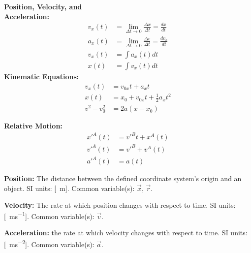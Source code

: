 \begin{importantEquations}
\begin{multicols}{2}
\begin{center}
\textbf{Position, Velocity, and\\ Acceleration:}
\begin{align*}
v_x(t)&=\lim_{\Delta t\to 0}\frac{\Delta x}{\Delta t}=\frac{dx}{dt}\\
a_x(t)&=\lim_{\Delta t\to 0}\frac{\Delta v}{\Delta t}=\frac{dv_x}{dt}\\
v_x(t)&=\int a_x(t)dt\\
x(t)&=\int v_x(t)dt
\end{align*}
\textbf{Kinematic Equations:}
\begin{align*}
v_x(t)&=v_{0x}t+a_xt\\
x(t)&=x_0+v_{0x}t+\frac{1}{2}a_xt^2\\
v^2-v_0^2&=2a(x-x_0)
\end{align*}
\end{center}
\columnbreak
\begin{center}
\textbf{Relative Motion:}\\
\begin{align*}
x'^A(t) &= v'^Bt + x^A(t)\\
v'^A(t) &=v'^B+v^A(t)\\
a'^A(t) &= a(t)
\end{align*}
\end{center}
\end{multicols}
\end{importantEquations}

\begin{definitions}

\item \textbf{Position:} The distance between the defined coordinate system's origin and an object. SI units: [\SI{}{m}]. Common variable(s): $\vec x$, $\vec r$.

\item \textbf{Velocity:} The rate at which position changes with respect to time. SI units: [\SI{}{ms^{-1}}]. Common variable(s): $\vec v$.

\item \textbf{Acceleration:} the rate at which velocity changes with respect to time. SI units: [\SI{}{ms^{-2}}]. Common variable(s): $\vec a$.

\end{definitions}

\newpage
